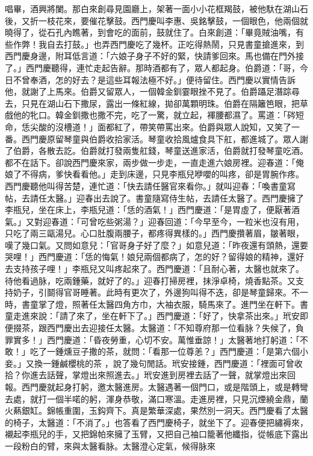 \begin{showcontents}{}
唱畢，酒興將闌。那白來創尋見園廳上，架著一面小小花框羯鼓，被他馱在湖山石後，又折一枝花來，要催花擊鼓。西門慶叫李惠、吳銘擊鼓，一個眼色，他兩個就曉得了，從石孔內瞧著，到會吃的面前，鼓就住了。白來創道：「畢竟賊油嘴，有些作弊！我自去打鼓。」也弄西門慶吃了幾杯。正吃得熱鬧，只見書童搶進來，到西門慶身邊，附耳低言道：「六娘子身子不好的緊，快請爹回來。馬也備在門外接了。」西門慶聽得，連忙走起告辭。那時酒都有了，眾人都起身。伯爵道：「哥，今日不曾奉酒，怎的好去？是這些耳報法極不好。」便待留住。西門慶以實情告訴他，就謝了上馬來。伯爵又留眾人，一個韓金釧霎眼挫不見了。伯爵躡足潛踪尋去，只見在湖山石下撒尿，露出一條紅線，拋卻萬顆明珠。伯爵在隔籬笆眼，把草戲他的牝口。韓金釧撒也撒不完，吃了一驚，就立起，褌腰都濕了。罵道：「硶短命，恁尖酸的沒槽道！」面都紅了，帶笑帶罵出來。伯爵與眾人說知，又笑了一番。西門慶原留琴童與伯爵收拾家活。琴童收拾風爐食具下舡，都進城了。眾人謝了伯爵，各散去訖。伯爵就打發兩隻舡錢，琴童送進家活，伯爵就打發琴童吃酒。都不在話下。卻說西門慶來家，兩步做一步走，一直走進六娘房裡。迎春道：「俺娘了不得病，爹快看看他。」走到床邊，只見李瓶兒咿嚶的叫疼，卻是胃腕作疼。西門慶聽他叫得苦楚，連忙道：「快去請任醫官來看你。」就叫迎春：「喚書童寫帖，去請任太醫。」迎春出去說了。書童隨寫侍生帖，去請任太醫了。西門慶擁了李瓶兒，坐在床上，李瓶兒道：「恁的酒氣！」西門慶道：「是胃虛了，便厭著酒氣。」又對迎春道：「可曾吃些粥湯？」迎春回道：「今早至今，一粒米也沒有用，只吃了兩三甌湯兒。心口肚腹兩腰子，都疼得異樣的。」西門慶攢著眉，皺著眼，嘆了幾口氣。又問如意兒：「官哥身子好了麼？」如意兒道：「昨夜還有頭熱，還要哭哩！」西門慶道：「恁的悔氣！娘兒兩個都病了，怎的好？留得娘的精神，還好去支持孩子哩！」李瓶兒又叫疼起來了。西門慶道：「且耐心著，太醫也就來了。待他看過脉，吃兩鍾藥，就好了的。」迎春打掃房裡，抹淨卓椅，燒香點茶。又支持奶子，引鬬得官哥睡著。此時有更次了，外邊狗叫得不迭，卻是琴童歸來。不一時，書童掌了燈，照著任太醫四角方巾，大袖衣服，騎馬來了。進門坐在軒下。書童走進來說：「請了來了，坐在軒下了。」西門慶道：「好了，快拿茶出來。」玳安即便掇茶，跟西門慶出去迎接任太醫。太醫道：「不知尊府那一位看脉？失候了，負罪實多！」西門慶道：「昏夜勞重，心切不安。萬惟垂諒！」太醫著地打躬道：「不敢！」吃了一鍾燻豆子撒的茶，就問：「看那一位尊恙？」西門慶道：「是第六個小妾。」又換一鍾鹹櫻桃的茶 ，說了幾句閒話。玳安接鍾，西門慶道：「裡面可曾收拾？你進去話聲，掌燈出來照進去。」玳安進到房裡去話了一聲，就掌燈出來回報。西門慶就起身打躬，邀太醫進房。太醫遇著一個門口，或是階頭上，或是轉彎去處，就打一個半喏的躬，渾身恭敬，滿口寒溫。走進房裡，只見沉煙繞金鼎，蘭火爇銀缸。錦帳重圍，玉鈎齊下。真是繁華深處，果然別一洞天。西門慶看了太醫的椅子，太醫道：「不消了。」也答看了西門慶椅子，就坐下了。迎春便把繡褥來，襯起李瓶兒的手，又把錦帕來擁了玉臂，又把自己袖口籠著他纖指，從帳底下露出一段粉白的臂，來與太醫看脉。太醫澄心定氣，候得脉來 
\end{showcontents}
